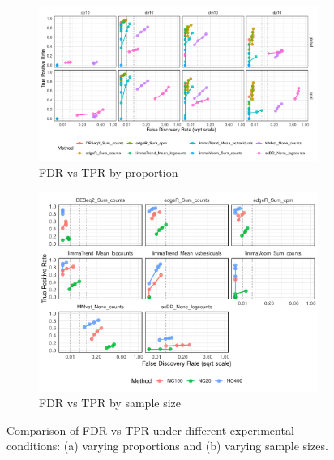 \documentclass[a4paper, 11pt, twocolumn]{article}
\begin{document}
\begin{figure}[h]
	\centering
	\begin{subfigure}[t]{0.9\textwidth}
		\centering
		\includegraphics[width=\textwidth]{figs/fdrtpr_prop_method_Kang.pdf}
		\caption{FDR vs TPR by proportion}
		\label{fig:fdrtpr_prop_kang}
	\end{subfigure}
	
	\vspace{1em}
	
	\begin{subfigure}[t]{0.8\textwidth}
		\centering
		\includegraphics[width=\textwidth]{figs/fdrtpr_size_method_Kang.pdf}
		\caption{FDR vs TPR by sample size}
		\label{fig:fdrtpr_size}
	\end{subfigure}
	
	\caption{Comparison of FDR vs TPR under different experimental conditions: (a) varying proportions and (b) varying sample sizes.}
	\label{fig:fdrtpr_combined_kang}
\end{figure}
\end{document}
